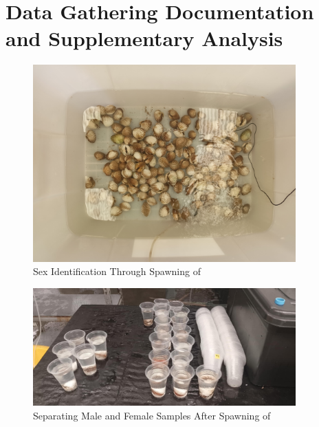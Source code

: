 %
%
%                 

\chapter{Data Gathering Documentation and Supplementary Analysis}
\label{sec:appendixa}



%


\begin{figure}[!htbp]
	\centering
	\includegraphics[width=0.9\textwidth]{figures/spawning.jpg}
	\caption{Sex Identification Through Spawning of \Tegillarcagranosa}
\end{figure}

\begin{figure}[!htbp]
	\centering
	\includegraphics[width=0.9\textwidth]{figures/spawning_separated.jpg}
	\caption{Separating Male and Female Samples After Spawning of \Tegillarcagranosa}
\end{figure}

